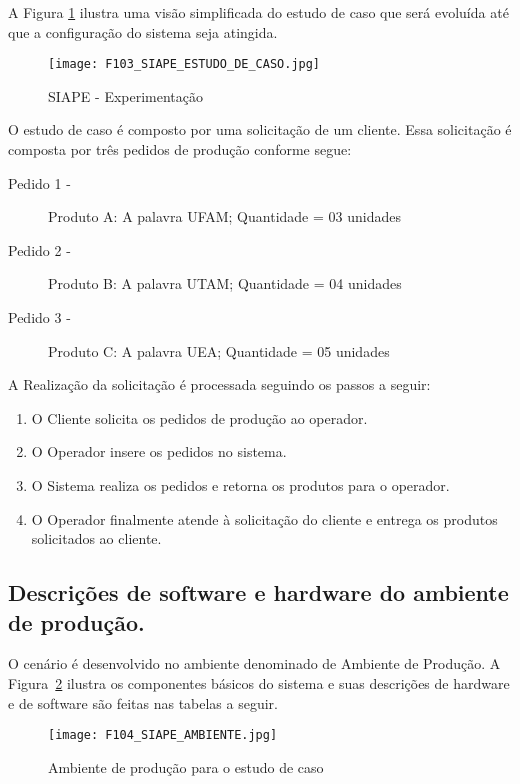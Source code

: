 A Figura \ref{F103} ilustra uma visão simplificada  do estudo de caso que será evoluída até que a configuração do sistema seja atingida.

	\begin{figure}[h]
		\centering
		\texttt{[image: F103\_SIAPE\_ESTUDO\_DE\_CASO.jpg]} 
		\caption{SIAPE - Experimentação}
		\label{F103}
	\end{figure}

O estudo de caso é composto por uma solicitação de um cliente. Essa solicitação é composta por três pedidos de produção conforme segue:

\begin{description}
	\item[Pedido 1 -] Produto A: A  palavra UFAM; Quantidade = 03 unidades
	\item[Pedido 2 -] Produto  B: A  palavra UTAM; Quantidade = 04 unidades
	\item[Pedido 3 -] Produto  C: A palavra UEA; Quantidade = 05 unidades
\end{description} 

A Realização da  solicitação é processada seguindo os passos a seguir:

\begin{enumerate}
	\item O Cliente solicita os pedidos de produção ao operador.
	\item O Operador insere os pedidos no sistema.
	\item O Sistema realiza os pedidos e retorna os produtos para o operador.
	\item O Operador finalmente atende à solicitação do cliente e entrega os produtos solicitados ao cliente.
\end{enumerate} 

\subsection{Descrições de software e hardware do ambiente de produção.}


O cenário é desenvolvido no ambiente denominado de Ambiente de Produção. A Figura~\ref{F104} ilustra os componentes básicos do sistema e suas descrições de hardware e de software são feitas nas tabelas a seguir.

	\begin{figure}
		\centering
		\texttt{[image: F104\_SIAPE\_AMBIENTE.jpg]} 
		\caption{Ambiente de produção para o estudo de caso}
		\label{F104}
	\end{figure}

